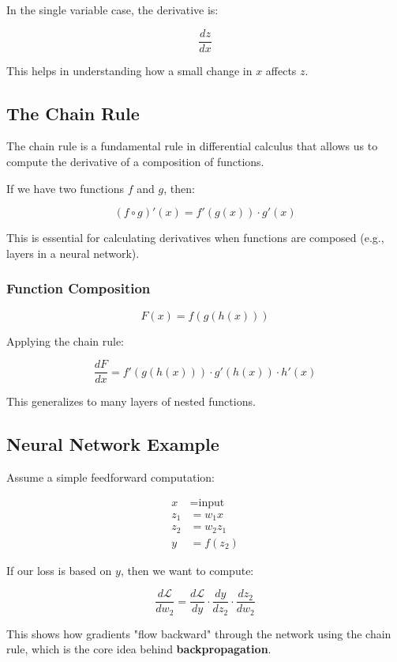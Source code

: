 In the single variable case, the derivative is:

\[
\frac{dz}{dx}
\]

This helps in understanding how a small change in $x$ affects $z$.    

\subsection{The Chain Rule}

The chain rule is a fundamental rule in differential calculus that allows us to compute the derivative of a composition of functions.

If we have two functions \( f \) and \( g \), then:

\[
(f \circ g)'(x) = f'(g(x)) \cdot g'(x)
\]

This is essential for calculating derivatives when functions are composed (e.g., layers in a neural network).

\subsubsection{Function Composition}

\[
F(x) = f(g(h(x)))
\]

Applying the chain rule:

\[
\frac{dF}{dx} = f'(g(h(x))) \cdot g'(h(x)) \cdot h'(x)
\]

This generalizes to many layers of nested functions.

\subsection{Neural Network Example}

Assume a simple feedforward computation:

\begin{align*}
x &= \text{input} \\
z_1 &= w_1 x \\
z_2 &= w_2 z_1 \\
y &= f(z_2)
\end{align*}

If our loss is based on \( y \), then we want to compute:

\[
\frac{d\mathcal{L}}{dw_2} = \frac{d\mathcal{L}}{dy} \cdot \frac{dy}{dz_2} \cdot \frac{dz_2}{dw_2}
\]

This shows how gradients "flow backward" through the network using the chain rule, which is the core idea behind \textbf{backpropagation}.

